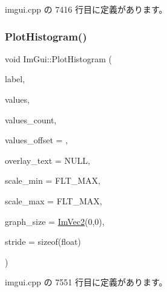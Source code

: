  imgui.\+cpp の 7416 行目に定義があります。

\mbox{\label{namespace_im_gui_af7a92b2118981835b5251bfdaac50252}} 
\subsubsection{\texorpdfstring{Plot\+Histogram()}{PlotHistogram()}\hspace{0.1cm}{\footnotesize\ttfamily [1/2]}}
{\footnotesize\ttfamily void Im\+Gui\+::\+Plot\+Histogram (\begin{DoxyParamCaption}\item[{const char $\ast$}]{label,  }\item[{const float $\ast$}]{values,  }\item[{int}]{values\+\_\+count,  }\item[{int}]{values\+\_\+offset = {},  }\item[{const char $\ast$}]{overlay\+\_\+text = {\ttfamily NULL},  }\item[{float}]{scale\+\_\+min = {\ttfamily FLT\+\_\+MAX},  }\item[{float}]{scale\+\_\+max = {\ttfamily FLT\+\_\+MAX},  }\item[{\mbox{\hyperlink{struct_im_vec2}{Im\+Vec2}}}]{graph\+\_\+size = {\ttfamily \mbox{\hyperlink{struct_im_vec2}{Im\+Vec2}}(0,0)},  }\item[{int}]{stride = {\ttfamily sizeof(float)} }\end{DoxyParamCaption})}



 imgui.\+cpp の 7551 行目に定義があります。

\mbox{\label{namespace_im_gui_af8089203baf8cf723a158c9e34bda2a4}} 
